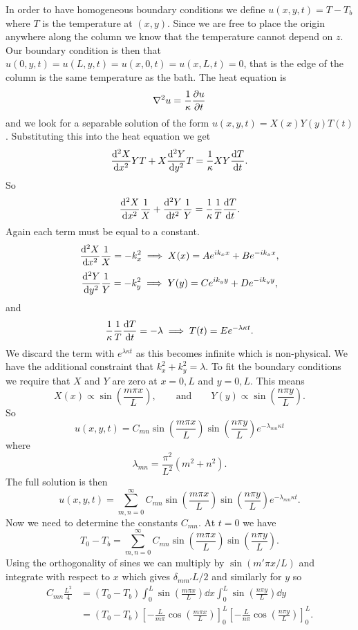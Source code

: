 \documentclass[a4paper]{article}
\begin{document}
    In order to have homogeneous boundary conditions we define \(u(x, y, t) = T - T_b\) where \(T\) is the temperature at \((x, y)\).
    Since we are free to place the origin anywhere along the column we know that the temperature cannot depend on \(z\).
    Our boundary condition is then that \(u(0, y, t) = u(L, y, t) = u(x, 0, t) = u(x, L, t) = 0\), that is the edge of the column is the same temperature as the bath.
    The heat equation is
    \[\nabla^2 u = \frac{1}{\kappa}\pdv{u}{t}\]
    and we look for a separable solution of the form \(u(x, y, t) = X(x)Y(y)T(t)\).
    Substituting this into the heat equation we get
    \[\dv[2]{X}{x}YT + X\dv[2]{Y}{y}T = \frac{1}{\kappa}XY\dv{T}{t}.\]
    So
    \[\dv[2]{X}{x}\frac{1}{X} + \dv[2]{Y}{t}\frac{1}{Y} = \frac{1}{\kappa}\frac{1}{T}\dv{T}{t}.\]
    Again each term must be equal to a constant.
    \[\dv[2]{X}{x}\frac{1}{X} = -k_x^2 \implies X(x) = Ae^{ik_xx} + Be^{-ik_xx},\]
    \[\dv[2]{Y}{y}\frac{1}{Y} = -k_y^2 \implies Y(y) = Ce^{ik_yy} + De^{-ik_yy},\]
    and
    \[\frac{1}{\kappa}\frac{1}{T}\dv{T}{t} = -\lambda \implies T(t) = Ee^{-\lambda\kappa t}.\]
    We discard the term with \(e^{\lambda\kappa t}\) as this becomes infinite which is non-physical.
    We have the additional constraint that \(k_x^2 + k_y^2 = \lambda\).
    To fit the boundary conditions we require that \(X\) and \(Y\) are zero at \(x = 0, L\) and \(y = 0, L\).
    This means
    \[X(x) \propto \sin\left(\frac{m\pi x}{L}\right), \qquad\text{and}\qquad Y(y) \propto \sin\left(\frac{n\pi y}{L}\right).\]
    So
    \[u(x, y, t) = C_{mn}\sin\left(\frac{m\pi x}{L}\right)\sin\left(\frac{n\pi y}{L}\right)e^{-\lambda_{mn}\kappa t}\]
    where
    \[\lambda_{mn} = \frac{\pi^2}{L^2}(m^2 + n^2).\]
    The full solution is then
    \[u(x, y, t) = \sum_{m, n=0}^{\infty}  C_{mn}\sin\left(\frac{m\pi x}{L}\right)\sin\left(\frac{n\pi y}{L}\right)e^{-\lambda_{mn}\kappa t}.\]
    Now we need to determine the constants \(C_{mn}\).
    At \(t = 0\) we have
    \[T_0 - T_b = \sum_{m, n=0}^{\infty}  C_{mn}\sin\left(\frac{m\pi x}{L}\right)\sin\left(\frac{n\pi y}{L}\right).\]
    Using the orthogonality of sines we can multiply by \(\sin(m'\pi x/L)\) and integrate with respect to \(x\) which gives \(\delta_{mm'}L/2\) and similarly for \(y\) so
    \begin{align*}
        C_{mn}\frac{L^2}{4} &= (T_0 - T_b)\int_0^L \sin\left(\frac{m\pi x}{L}\right)\dd{x} \int_0^L \sin\left(\frac{n\pi y}{L}\right)\dd{y}\\
        &= (T_0 - T_b)\left[-\frac{L}{m\pi}\cos\left(\frac{m\pi x}{L}\right)\right]_0^L\left[-\frac{L}{n\pi}\cos\left(\frac{n\pi y}{L}\right)\right]_0^L.
    \end{align*}
\end{document}
